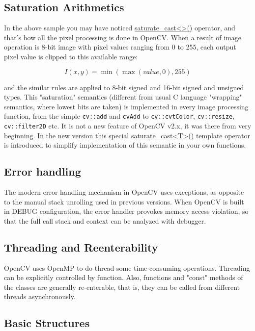 \subsection{Saturation Arithmetics}

In the above sample you may have noticed \href{saturate}{saturate\_cast<>()} operator, and that's how all the pixel processing is done in OpenCV. When a result of image operation is 8-bit image with pixel values ranging from 0 to 255, each output pixel value is clipped to this available range:

\[
I(x,y)=\min(\max(value, 0), 255)
\]

and the similar rules are applied to 8-bit signed and 16-bit signed and unsigned types. This "saturation" semantics (different from usual C language "wrapping" semantics, where lowest bits are taken) is implemented in every image processing function, from the simple \texttt{cv::add} and \texttt{cvAdd} to \texttt{cv::cvtColor}, \texttt{cv::resize}, \texttt{cv::filter2D} etc.
It is not a new feature of OpenCV v2.x, it was there from very beginning. In the new version this special \href{saturate}{saturate\_cast<T>()} template operator is introduced to simplify implementation of this semantic in your own functions.


\subsection{Error handling}

The modern error handling mechanism in OpenCV uses exceptions, as opposite to the manual stack unrolling used in previous versions. When OpenCV is built in DEBUG configuration, the error handler provokes memory access violation, so that the full call stack and context can be analyzed with debugger.

\subsection{Threading and Reenterability}

OpenCV uses OpenMP to do thread some time-consuming operations. Threading can be explicitly controlled by  function. Also, functions and "const" methods of the classes are generally re-enterable, that is, they can be called from different threads asynchronously.

\subsection{Basic Structures}

